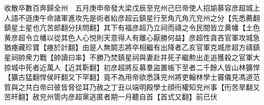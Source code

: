 收散卒數百奔歸全州　五月庚申帝發大梁戊辰至兖州己巳帝使人招諭慕容彦超城上人語不遜庚午命諸軍進攻先是術者紿彦超云鎮星行至角亢角亢兖州之分【先悉薦翻鎮星土星也亢苦郎翻分扶問翻】其下有福彦超乃立祠而禱之令民間皆立黄幡【土色黄彦超令立幡以從其色人心悦則天意得人有離心厭勝何益】彦超性貪吝官軍攻城急猶瘞藏珍寶【瘞於計翻】由是人無鬬志將卒相繼有出降者乙亥官軍克城彦超方禱鎮星祠帥衆力戰【帥讀曰率】不勝乃焚鎮星祠與妻赴井死子繼勲出走追獲殺之官軍大掠城中死者近萬人【近其靳翻】初彦超將反募羣盜置帳下至者二千餘人皆山林獷悍【獷古猛翻悍侯旰翻又下罕翻】竟不為用帝欲悉誅兖州將吏翰林學士竇儀見馮道范質與之共白帝曰彼皆脅從耳乃赦之丁丑以端明殿學士顔衎權知兖州事【衎苦旱翻又苦旰翻】赦兖州管内彦超黨逃匿者期一月聽自首【首式又翻】前已伏